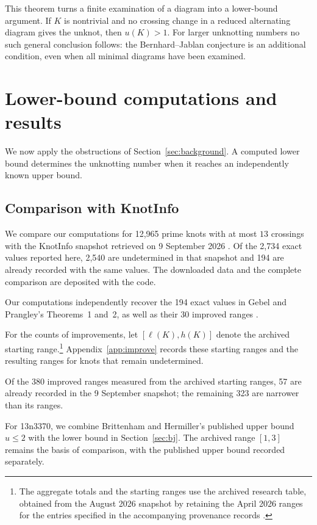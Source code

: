 \documentclass[12pt, oneside]{amsart}
\newcommand{\KI}{\textsf{KnotInfo}}
\newcommand{\kn}[2]{\textup{#1#2}}
\newcommand{\nExact}{2{,}734}
\newcommand{\nImproved}{380}
\newcommand{\nRefKnots}{12{,}965}
\newcommand{\nGPExact}{194}
\newcommand{\nGPImproved}{30}
\newcommand{\nLatestExactAgreements}{194}
\newcommand{\nLatestRangeAgreements}{57}
\newcommand{\nLatestRangeImprovements}{323}
\newcommand{\nLatestUnresolvedExact}{2{,}540}
\begin{document}
This theorem turns a finite examination of a diagram into a lower-bound argument. If
$K$ is nontrivial and no crossing change in a reduced alternating diagram gives the
unknot, then $u(K)>1$. For larger unknotting numbers no such general conclusion follows:
the Bernhard--Jablan conjecture is an additional condition, even when all minimal diagrams
have been examined.


\section{Lower-bound computations and results}\label{sec:lower}

We now apply the obstructions of Section~\ref{sec:background}. A computed lower bound
determines the unknotting number when it reaches an independently known upper bound.
\subsection{Comparison with KnotInfo}\label{sec:reference}

We compare our computations for \nRefKnots{} prime knots with at most $13$
crossings with the \KI{} snapshot retrieved on 9 September 2026 \cite{KnotInfo}.
Of the \nExact{} exact values reported here, \nLatestUnresolvedExact{} are
undetermined in that snapshot and \nLatestExactAgreements{} are already
recorded with the same values. The downloaded data and the complete
comparison are deposited with the code.

Our computations independently recover the \nGPExact{} exact values in Gebel
and Prangley's Theorems~1 and~2, as well as their \nGPImproved{} improved
ranges \cite{GP}.

For the counts of improvements, let $[\ell(K),h(K)]$ denote the archived
starting range.\footnote{The aggregate totals and the starting ranges use the
archived research table, obtained from the August 2026 snapshot by retaining
the April 2026 ranges for the entries specified in the accompanying provenance
records \cite{KnotInfoSnapshots}.} Appendix~\ref{app:improve} records these starting ranges and the
resulting ranges for knots that remain undetermined.

Of the \nImproved{} improved ranges measured from the archived starting
ranges, \nLatestRangeAgreements{} are already recorded in the 9 September
snapshot; the remaining \nLatestRangeImprovements{} are narrower than its
ranges.

For \kn{13n}{3370}, we combine Brittenham and Hermiller's published upper
bound $u\le2$ \cite[Thm.~1.3(a)]{BH1705} with the lower bound in
Section~\ref{sec:bj}. The archived range $[1,3]$ remains the basis of
comparison, with the published upper bound recorded separately.
\end{document}
